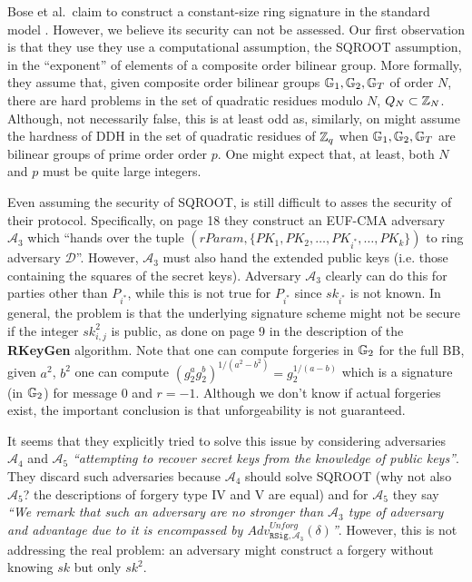 
Bose et al.~claim to construct a constant-size ring signature in the standard model \cite{ACISP:BosDasRan15}. However, we believe its security can not be assessed. Our first observation is that they use they use a computational assumption, the SQROOT assumption, in the ``exponent'' of elements of a composite order bilinear group. More formally, they assume that, given composite order bilinear groups $\mathbb{G}_1,\mathbb{G}_2,\mathbb{G}_T$ of order $N$, there are hard problems in the set of quadratic residues modulo $N$, $Q_N\subset \mathbb{Z}_N$. Although, not necessarily false, this is at least odd as, similarly, on might assume the hardness of DDH in the set of quadratic residues of $\mathbb{Z}_q$ when $\mathbb{G}_1,\mathbb{G}_2,\mathbb{G}_T$ are bilinear groups of prime order order $p$. One might expect that, at least, both $N$ and $p$ must be quite large integers.

Even assuming the security of SQROOT, is still difficult to asses the security of their protocol. Specifically, on page 18 they construct an EUF-CMA adversary $\mathcal{A}_3$ which ``hands over the tuple $(rParam, \{PK_1, PK_2, \ldots, PK_{i^*} , \ldots, PK_k\})$ to ring adversary $\mathcal{D}$''. However, $\mathcal{A}_3$ must also hand the extended public keys (i.e. those containing the squares of the secret keys). Adversary $\mathcal{A}_3$ clearly can do this for parties other than $P_{i^*}$, while this is not true for $P_{i^*}$ since $sk_{i^*}$ is not known.
In general, the problem is that the underlying signature scheme might not be secure if the integer $sk_{i,j}^2$ is public, as done on page 9 in the description of the {\bf RKeyGen} algorithm. Note that one can compute forgeries in $\mathbb{G}_2$ for the full BB, given $a^2$, $b^2$ one can compute $(g_2^{a} g_2^{b})^{1/(a^2-b^2)}=g_2^{1/(a-b)}$ which is a signature (in $\mathbb{G}_2$) for message $0$ and $r=-1$. Although we don't know if actual forgeries exist, the important conclusion is that unforgeability is not guaranteed.

It seems that they explicitly tried to solve this issue by considering adversaries $\mathcal{A}_4$ and $\mathcal{A}_5$ \emph{``attempting to recover secret keys from the knowledge of public keys''}. 
They discard such adversaries because $\mathcal{A}_4$ should solve  SQROOT (why not also $\mathcal{A}_5$? the descriptions of forgery type IV and V are equal) and for $\mathcal{A}_5$ they say \emph{``We remark that such an adversary are no stronger than $\mathcal{A}_3$ type of adversary and advantage due to it is encompassed by $Adv^{Unforg}_{\mathtt{RSig},\mathcal{A}_3} (\delta)$''}. However, this is not addressing the real problem: an adversary might construct a forgery without knowing $sk$ but only $sk^2$.

